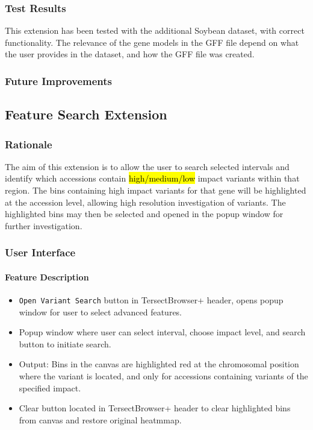 \documentclass[12pt]{article}
\begin{document}
\begin{itemize}
\subsubsection{Test Results}
This extension has been tested with the additional Soybean dataset, with correct functionality. The relevance of the gene models in the GFF file depend on what the user provides in the dataset, and how the GFF file was created. 

\subsubsection{Future Improvements}

\subsection{Feature Search Extension}
\subsubsection{Rationale}
The aim of this extension is to allow the user to search selected intervals and identify which accessions contain \hl{high/medium/low} impact variants within that region. The bins containing high impact variants for that gene will be highlighted at the accession level, allowing high resolution investigation of variants. The highlighted bins may then be selected and opened in the popup  window for further investigation.

\subsubsection{User Interface}
\paragraph{Feature Description}
\begin{itemize}
    \item \verb+Open Variant Search+ button in TersectBrowser+ header, opens popup window for user to select advanced features.
    \item Popup window where user can select interval, choose impact level, and search button to initiate search.
    \item Output: Bins in the canvas are highlighted red at the chromosomal position where the variant is located, and only for accessions containing variants of the specified impact.
    \item Clear button located in TersectBrowser+ header to clear highlighted bins from canvas and restore original heatmmap.
\end{itemize}

\end{itemize}
\end{document}
